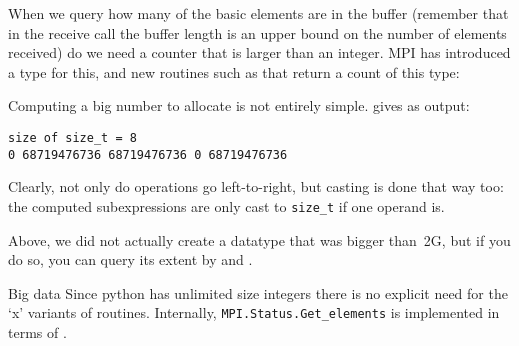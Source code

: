 When we query how many of the basic elements are in the buffer
(remember that in the receive call the buffer length is
an upper bound on the number of elements received)
do we
need a counter that is larger than an integer.  MPI has introduced a
type  for this, and new routines such as
 that return a
count of this type:


\begin{remark}
  Computing a big number to allocate is not entirely simple.
  gives as output:
\begin{verbatim}
size of size_t = 8
0 68719476736 68719476736 0 68719476736
\end{verbatim}
Clearly, not only do operations go left-to-right, but casting is done that way too:
the computed subexpressions are only cast to \lstinline{size_t} if one operand is.
\end{remark}

Above, we did not actually create a datatype that was bigger than~2G,
but if you do so, you can query its extent by
and
.

\begin{pythonnote}{Big data}
  Since python has unlimited size integers there is
  no explicit need for the `x' variants of routines.
  Internally, \lstinline+MPI.Status.Get_elements+ is implemented
  in terms of .
\end{pythonnote}


